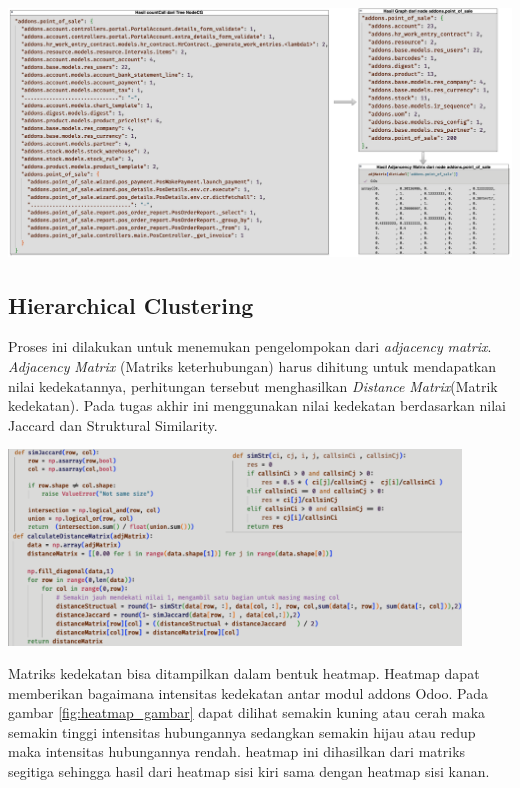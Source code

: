 \begin{center}
	\includegraphics[width=14cm]{img/bab_4/optimisasi_5.png}
	\label{fig:optimasi_5}
\end{center}


\subsection{Hierarchical Clustering}
Proses ini dilakukan untuk menemukan pengelompokan dari \textit{adjacency} \textit{matrix}. \textit{Adjacency} \textit{Matrix} (Matriks keterhubungan) harus dihitung untuk mendapatkan nilai kedekatannya, perhitungan tersebut menghasilkan \textit{Distance} \textit{Matrix}(Matrik kedekatan). Pada tugas akhir ini menggunakan nilai kedekatan berdasarkan nilai Jaccard dan Struktural Similarity. 

\begin{center}
	\includegraphics[width=12cm]{img/bab_4/hc_1.png}
	\label{fig:hc_1}
\end{center}

Matriks kedekatan bisa ditampilkan dalam bentuk heatmap. Heatmap dapat memberikan bagaimana intensitas kedekatan antar modul addons Odoo. Pada gambar \ref{fig:heatmap_gambar} dapat dilihat semakin kuning atau cerah maka semakin tinggi intensitas hubungannya sedangkan semakin hijau atau redup maka intensitas hubungannya rendah. heatmap ini dihasilkan dari matriks segitiga sehingga hasil dari heatmap sisi kiri sama dengan heatmap sisi kanan.

